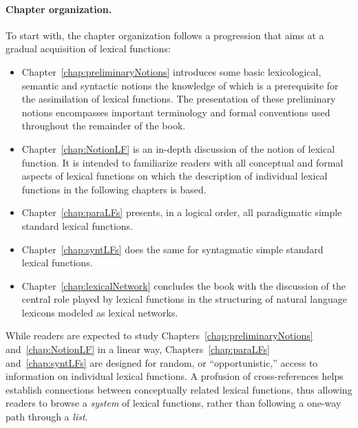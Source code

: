\paragraph*{Chapter organization.}

To start with, the chapter organization follows a progression that aims at a gradual acquisition of lexical functions:

\begin{itemize}
\setlength\itemsep{0pt}

\item Chapter~\ref{chap:preliminaryNotions} introduces some basic lexicological, semantic and syntactic notions the knowledge of which is a prerequisite for the assimilation of lexical functions. The presentation of these preliminary notions encompasses important terminology and formal conventions used throughout the remainder of the book.

\item Chapter~\ref{chap:NotionLF} is an in-depth discussion of the notion of lexical function. It is intended to familiarize readers with all conceptual and formal aspects of lexical functions on which the description of individual lexical functions in the following chapters is based.

\item Chapter~\ref{chap:paraLFs} presents, in a logical order, all paradigmatic simple standard lexical functions.

\item Chapter~\ref{chap:syntLFs} does the same for syntagmatic simple standard lexical functions.

\item Chapter~\ref{chap:lexicalNetwork} concludes the book with the discussion of the central role played by lexical functions in the structuring of natural language lexicons modeled as lexical networks.

\end{itemize}

While readers are expected to study Chapters~\ref{chap:preliminaryNotions} and~\ref{chap:NotionLF} in a linear way, Chapters~\ref{chap:paraLFs} and~\ref{chap:syntLFs} are designed for random, or ``opportunistic,'' access to information on individual lexical functions. A profusion of cross-references helps establish connections between conceptually related lexical functions, thus allowing readers to browse a \emph{system} of lexical functions, rather than following a one-way path through a \emph{list}.

